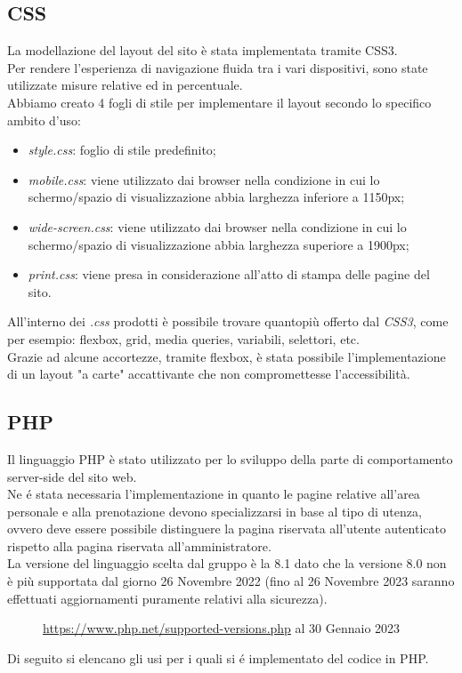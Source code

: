 \documentclass{article}
\begin{document}
\subsection{CSS}
La modellazione del layout del sito è stata implementata tramite CSS3.\\
Per rendere l'esperienza di navigazione fluida tra i vari dispositivi, sono state utilizzate misure relative ed in percentuale.\\
Abbiamo creato 4 fogli di stile per implementare il layout secondo lo specifico ambito d'uso:
\begin{itemize}
	\item \textit{style.css}: foglio di stile predefinito;
	\item \textit{mobile.css}: viene utilizzato dai browser nella condizione in cui lo schermo/spazio di visualizzazione abbia larghezza inferiore a 1150px;
	\item \textit{wide-screen.css}: viene utilizzato dai browser nella condizione in cui lo schermo/spazio di visualizzazione abbia larghezza superiore a 1900px;
	\item \textit{print.css}: viene presa in considerazione all'atto di stampa delle pagine del sito.
\end{itemize}
All'interno dei \textit{.css} prodotti è possibile trovare quantopiù offerto dal \textit{CSS3}, come per esempio: flexbox, grid, media queries, variabili, selettori, etc.\\
Grazie ad alcune accortezze, tramite flexbox, è stata possibile l'implementazione di un layout  "a carte" accattivante che non compromettesse l'accessibilità.

\subsection{PHP} %
Il linguaggio PHP è stato utilizzato per lo sviluppo della parte di comportamento server-side del sito web. \\
Ne é stata necessaria l'implementazione in quanto le pagine relative all'area personale e alla prenotazione devono specializzarsi in base al tipo di utenza, ovvero deve essere possibile distinguere la pagina riservata all'utente autenticato rispetto alla pagina riservata all'amministratore.\\
La versione del linguaggio scelta dal gruppo è la 8.1 dato che la versione 8.0 non è più supportata dal giorno 26 Novembre 2022 (fino al 26 Novembre 2023 saranno effettuati aggiornamenti puramente relativi alla sicurezza).
\begin{figure}[H]
	\centering
	\caption{\href{https://www.php.net/supported-versions.php}{https://www.php.net/supported-versions.php} al 30 Gennaio 2023}
\end{figure}
Di seguito si elencano gli usi per i quali si é implementato del codice in PHP.
\end{document}
